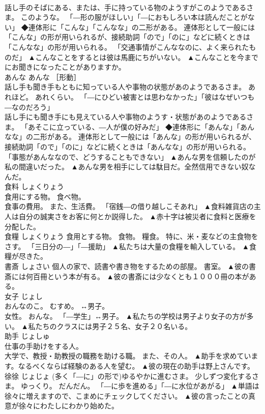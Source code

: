 \documentclass[8pt]{extreport}
\begin{document}
\begin{CJK}{UTF8}{min}
\\	話し手のそばにある、または、手に持っている物のようすがこのようであるさま。 このような。 「―形の服がほしい」「―におもしろい本は読んだことがない」 ◆連体形に「こんな」「こんなな」の二形がある。 連体形として一般には「こんな」の形が用いられるが、接続助詞「ので」「のに」などに続くときは「こんなな」の形が用いられる。 「交通事情がこんななのに、よく来られたものだ」	▲こんなことをするとは彼は馬鹿にちがいない。 ▲こんなことを今までにお聞きになったことがありますか。
\\	あんな	あんな	［形動］ 
\\	話し手も聞き手もともに知っている人や事物の状態があのようであるさま。 あれほど。 あれくらい。 「―にひどい被害とは思わなかった」「彼はなぜいつも―なのだろう」 
\\	話し手にも聞き手にも見えている人や事物のようす・状態があのようであるさま。 「あそこに立っている、―人が僕の好みだ」 ◆連体形に「あんな」「あんなな」の二形がある。 連体形として一般には「あんな」の形が用いられるが、接続助詞「ので」「のに」などに続くときは「あんなな」の形が用いられる。 「事態があんななので、どうすることもできない」	▲あんな男を信頼したのが私の間違いだった。 ▲あんな男を相手にしては駄目だ。全然信用できない奴なんだ。
\\	食料	しょくりょう	
\\	食用にする物。 食べ物。 
\\	食事の費用。 また、生活費。 「宿銭―の借り越しこそあれ」	▲食料雑貨店の主人は自分の誠実さをお客に何とか説得した。 ▲赤十字は被災者に食料と医療を分配した。
\\	食糧	しょくりょう	食用とする物。 食物。 糧食。 特に、米・麦などの主食物をさす。 「三日分の―」「―援助」	▲私たちは大量の食糧を輸入している。 ▲食糧が尽きた。
\\	書斎	しょさい	個人の家で、読書や書き物をするための部屋。 書室。	▲彼の書斎には何百冊という本が有る。 ▲彼の書斎には少なくとも１０００冊の本がある。
\\	女子	じょし	
\\	おんなのこ。 むすめ。 ↔男子。 
\\	女性。 おんな。 「―学生」↔男子。	▲私たちの学校は男子より女子の方が多い。 ▲私たちのクラスには男子２５名、女子２０名いる。
\\	助手	じょしゅ	
\\	仕事の手助けをする人。 
\\	大学で、教授・助教授の職務を助ける職。 また、その人。	▲助手を求めています。なるべくならば経験のある人を望む。 ▲彼の現在の助手は野上さんです。
\\	徐徐	じょじょ	(多く「―に」の形で)ゆるやかに進むさま。 少しずつ変化するさま。 ゆっくり。 だんだん。 「―に歩を進める」「―に水位があがる」	▲単語は徐々に増えますので、こまめにチェックしてください。 ▲彼の言ったことの真意が徐々にわたしにわかり始めた。

\end{CJK}
\end{document}
